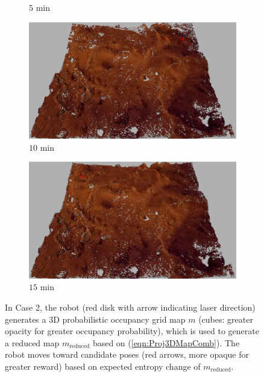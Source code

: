 \documentclass[conf]{new-aiaa}
\newcommand{\refeqn}[1]{(\ref{eqn:#1})}
\begin{document}
\begin{figure}[!t]
\begin{subfigure}[t]{0.49\columnwidth}
        		\caption{$5$ min}
		\vspace*{0.025\textwidth}
    	\end{subfigure}
	\centering
	\begin{subfigure}[t]{0.49\columnwidth}
           	\centering
          	\includegraphics[height=0.5\textwidth]{RdcdMarsMap10min.jpg}
        		\caption{$10$ min}
		\vspace*{0.025\textwidth}
    	\end{subfigure}
    	\begin{subfigure}[t]{0.49\columnwidth}
           	\centering
          	\includegraphics[height=0.5\textwidth]{RdcdMarsMap15min.jpg}
        		\caption{$15$ min}
		\vspace*{0.025\textwidth}
    	\end{subfigure}
\caption{In Case 2, the robot (red disk with arrow indicating laser direction) generates a 3D probabilistic occupancy grid map $m$ (cubes: greater opacity for greater occupancy probability), which is used to generate a reduced map $m_\text{reduced}$ based on \refeqn{Proj3DMapComb}. The robot moves toward candidate poses (red arrows, more opaque for greater reward) based on expected entropy change of $m_\text{reduced}$.}
\label{fig:mars3DogmCase2}
\end{figure}
\end{document}
